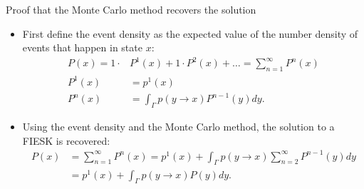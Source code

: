 \documentclass{beamer}
\begin{document}
\begin{frame}{Proof that the Monte Carlo method recovers the solution}

  \begin{itemize}
    \item First define the event density as the expected value of the number
      density of events that happen in state $x$:
      \begin{align}
        P(x) = 1 \cdot &P^1(x) + 1 \cdot P^2(x) + \ldots 
        = \sum_{n=1}^{\infty} P^n(x) \nonumber \\
        P^1(x) & = p^1(x) \nonumber \\
        P^n(x) & = \int_{\Gamma} p(y \to x) P^{n-1}(y)dy. \nonumber
      \end{align}
    \item Using the event density and the Monte Carlo method, the solution
      to a FIESK is recovered:
      \begin{align}
        P(x) & = \sum_{n=1}^{\infty} P^n(x) \nonumber
        = p^1(x) + \int_{\Gamma} p(y \to x) \sum_{n=2}^{\infty} P^{n-1}(y)dy 
        \nonumber\\
        & = p^1(x) + \int_{\Gamma} p(y \to x) P(y)dy \nonumber.
      \end{align}
  \end{itemize}

\end{frame}

\end{document}
